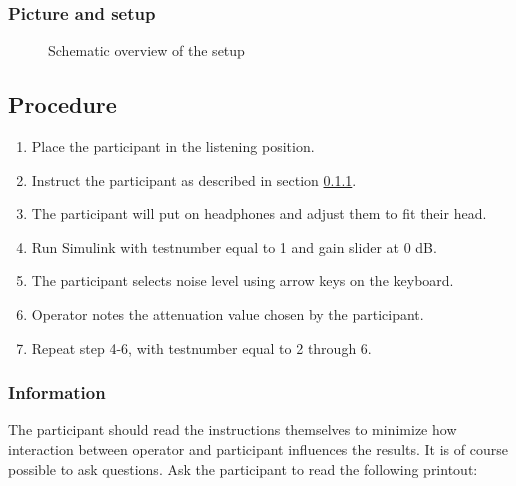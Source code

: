 \subsubsection{Picture and setup}

\begin{figure}[H]
	\centering
	
	\caption{Schematic overview of the setup}
	\label{fig:AttenuationSetup}
\end{figure}


\subsection{Procedure}

\begin{enumerate}
	\item Place the participant in the listening position.
	\item Instruct the participant as described in section \ref{subsubsec:attenuationInformation}.
	\item The participant will put on headphones and adjust them to fit their head.
	\item Run Simulink  with testnumber equal to 1 and gain slider at 0 dB.
	\item The participant selects noise level using arrow keys on the keyboard.
	\item Operator notes the attenuation value chosen by the participant.
	\item Repeat step 4-6, with testnumber equal to 2 through 6.
\end{enumerate}

\subsubsection{Information}\label{subsubsec:attenuationInformation}
The participant should read the instructions themselves to minimize how interaction between operator and participant influences the results. It is of course possible to ask questions.   
Ask the participant to read the following printout:

